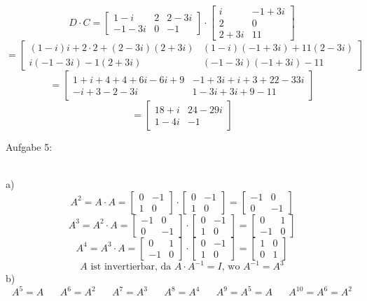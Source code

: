 \documentclass[11pt]{article}
\begin{document}
					$$D\cdot C=\begin{bmatrix}1-i&2&2-3i\\-1-3i&0&-1\end{bmatrix}\cdot\begin{bmatrix}i&-1+3i\\2&0\\2+3i&11\end{bmatrix}$$
					$$=\begin{bmatrix}(1-i)i+2\cdot 2+(2-3i)(2+3i)&(1-i)(-1+3i)+11(2-3i)\\i(-1-3i)-1(2+3i)&(-1-3i)(-1+3i)-11\end{bmatrix}$$
					$$=\begin{bmatrix}1+i+4+4+6i-6i+9&-1+3i+i+3+22-33i\\-i+3-2-3i&1-3i+3i+9-11\end{bmatrix}$$
					$$=\begin{bmatrix}18+i&24-29i\\1-4i&-1\end{bmatrix}$$
			\noindent \begin{Large}Aufgabe 5:\end{Large}\\[2pt]
				\indent a)\\
					$$A^2=A\cdot A=\begin{bmatrix}0&-1\\1&0\end{bmatrix}\cdot\begin{bmatrix}0&-1\\1&0\end{bmatrix}=\begin{bmatrix}-1&0\\0&-1\end{bmatrix}$$
					$$A^3=A^2\cdot A=\begin{bmatrix}-1&0\\0&-1\end{bmatrix}\cdot\begin{bmatrix}0&-1\\1&0\end{bmatrix}=\begin{bmatrix}0&1\\-1&0\end{bmatrix}$$
					$$A^4=A^3\cdot A=\begin{bmatrix}0&1\\-1&0\end{bmatrix}\cdot\begin{bmatrix}0&-1\\1&0\end{bmatrix}=\begin{bmatrix}1&0\\0&1\end{bmatrix}$$
					$$A \text{ ist invertierbar, da } A\cdot A^{-1}=I \text{, wo } A^{-1}=A^3$$
				\indent b)\\
					$$A^5=A \hspace{20pt} A^6=A^2 \hspace{20pt} A^7=A^3 \hspace{20pt} A^8=A^4 \hspace{20pt} A^9=A^5=A \hspace{20pt} A^10=A^6=A^2$$
\end{document}
